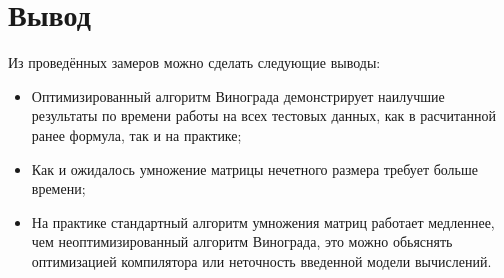 \section{Вывод}
Из проведённых замеров можно сделать следующие выводы:
\begin{itemize}
	\item{Оптимизированный алгоритм Винограда демонстрирует наилучшие результаты по времени работы на всех тестовых данных, как в расчитанной ранее формула, так и на практике;}
	\item{Как и ожидалось умножение матрицы нечетного размера требует больше времени;}
	\item{На практике стандартный алгоритм умножения матриц работает медленнее, чем неоптимизированный алгоритм Винограда, это можно обьяснять оптимизацией компилятора или неточность введенной модели вычислений.}
\end{itemize}


\clearpage

